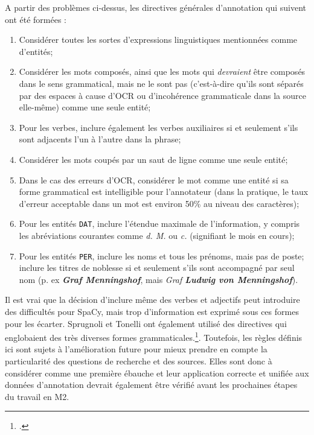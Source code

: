 \documentclass[a4paper,twoside,12pt]{article}
\begin{document}
A partir des problèmes ci-dessus, les directives générales d'annotation qui suivent ont été formées :
\vspace{1ex}
\begin{enumerate}
    \item Considérer toutes les sortes d'expressions linguistiques mentionnées comme d'entités;
    \item Considérer les mots composés, ainsi que les mots qui \textit{devraient} être composés dans le sens grammatical, mais ne le sont pas (c'est-à-dire qu'ils sont séparés par des espaces à cause d'OCR ou d'incohérence grammaticale dans la source elle-même) comme une seule entité;
    \item Pour les verbes, inclure également les verbes auxiliaires si et seulement s'ils sont adjacents l'un à l'autre dans la phrase;
    \item Considérer les mots coupés par un saut de ligne comme une seule entité;
    \item Dans le cas des erreurs d'OCR, considérer le mot comme une entité si sa forme grammatical est intelligible pour l'annotateur (dans la pratique, le taux d'erreur acceptable dans un mot est environ 50\% au niveau des caractères);
    \item Pour les entités \texttt{DAT}, inclure l'étendue maximale de l'information, y compris les abréviations courantes comme \textit{d. M.} ou \textit{c.} (signifiant le mois en cours);
    \item Pour les entités \texttt{PER}, inclure les noms et tous les prénoms, mais pas de poste; inclure les titres de noblesse si et seulement s'ils sont accompagné par seul nom (p. ex \textit{\textbf{Graf Menningshof}}, mais \textit{Graf \textbf{Ludwig von Menningshof}}).
\end{enumerate}
\vspace{2ex}

Il est vrai que la décision d'inclure même des verbes et adjectifs peut introduire des difficultés pour SpaCy, mais trop d'information est exprimé sous ces formes pour les écarter. Sprugnoli et Tonelli ont également utilisé des directives qui englobaient des très diverses formes grammaticales.\footcite[233-236]{sprugnoli_novel_2019}. Toutefois, les règles définis ici sont sujets à l'amélioration future pour mieux prendre en compte la particularité des questions de recherche et des sources. Elles sont donc à considérer comme une première ébauche et leur application correcte et unifiée aux données d'annotation devrait également être vérifié avant les prochaines étapes du travail en M2.
\end{document}
